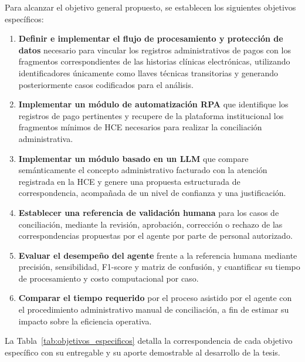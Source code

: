 Para alcanzar el objetivo general propuesto, se establecen los siguientes objetivos específicos:

\begin{enumerate}
    \item \textbf{Definir e implementar el flujo de procesamiento y protección de datos} necesario para vincular los registros administrativos de pagos con los fragmentos correspondientes de las historias clínicas electrónicas, utilizando identificadores únicamente como llaves técnicas transitorias y generando posteriormente casos codificados para el análisis.
    \item \textbf{Implementar un módulo de automatización RPA} que identifique los registros de pago pertinentes y recupere de la plataforma institucional los fragmentos mínimos de HCE necesarios para realizar la conciliación administrativa.
    \item \textbf{Implementar un módulo basado en un LLM} que compare semánticamente el concepto administrativo facturado con la atención registrada en la HCE y genere una propuesta estructurada de correspondencia, acompañada de un nivel de confianza y una justificación.
    \item \textbf{Establecer una referencia de validación humana} para los casos de conciliación, mediante la revisión, aprobación, corrección o rechazo de las correspondencias propuestas por el agente por parte de personal autorizado.
    \item \textbf{Evaluar el desempeño del agente} frente a la referencia humana mediante precisión, sensibilidad, F1-score y matriz de confusión, y cuantificar su tiempo de procesamiento y costo computacional por caso.
    \item \textbf{Comparar el tiempo requerido} por el proceso asistido por el agente con el procedimiento administrativo manual de conciliación, a fin de estimar su impacto sobre la eficiencia operativa.
\end{enumerate}

La Tabla~\ref{tab:objetivos_especificos} detalla la correspondencia de cada objetivo específico con su entregable y su aporte demostrable al desarrollo de la tesis.

